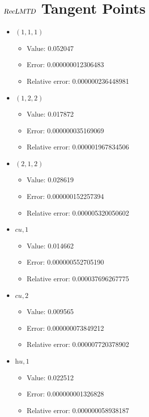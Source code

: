 \documentclass{article}%
\begin{document}
\section{$\textsl{RecLMTD}$ Tangent Points}%
\thispagestyle{plain}%
\begin{itemize}%
	\item $(1, 1, 1)$%
	\begin{itemize}%
		\item Value: 0.052047%
		\item Error: 0.000000012306483%
		\item Relative error: 0.000000236448981%
	\end{itemize}%
	\item $(1, 2, 2)$%
	\begin{itemize}%
		\item Value: 0.017872%
		\item Error: 0.000000035169069%
		\item Relative error: 0.000001967834506%
	\end{itemize}%
	\item $(2, 1, 2)$%
	\begin{itemize}%
		\item Value: 0.028619%
		\item Error: 0.000000152257394%
		\item Relative error: 0.000005320050602%
	\end{itemize}%
	\item $\textit{cu},1$%
	\begin{itemize}%
		\item Value: 0.014662%
		\item Error: 0.000000552705190%
		\item Relative error: 0.000037696267775%
	\end{itemize}%
	\item $\textit{cu},2$%
	\begin{itemize}%
		\item Value: 0.009565%
		\item Error: 0.000000073849212%
		\item Relative error: 0.000007720378902%
	\end{itemize}%
	\item $\textit{hu},1$%
	\begin{itemize}%
		\item Value: 0.022512%
		\item Error: 0.000000001326828%
		\item Relative error: 0.000000058938187%
	\end{itemize}%
\end{itemize}%
\end{document}
